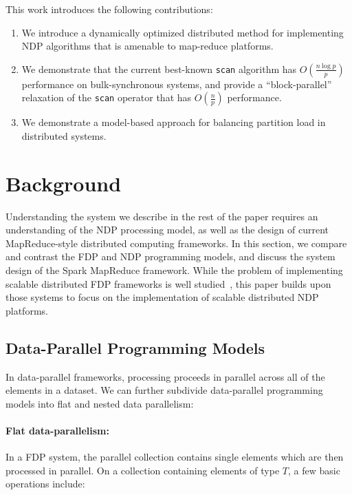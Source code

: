 \documentclass[preprint]{sigplanconf}
\theoremstyle{definition}
\begin{document}
This work introduces the following contributions:

\begin{enumerate}
\item We introduce a dynamically optimized distributed method for implementing NDP algorithms that is
amenable to map-reduce platforms.
\item We demonstrate that the current best-known \texttt{scan} algorithm has $O(\frac{n \log p}{p})$
performance on bulk-synchronous systems, and provide a ``block-parallel'' relaxation of the \texttt{scan}
operator that has $O(\frac{n}{p})$ performance.
\item We demonstrate a model-based approach for balancing partition load in distributed systems.
\end{enumerate}

\section{Background}
\label{sec:background}

Understanding the system we describe in the rest of the paper requires an understanding of the NDP
processing model, as well as the design of current MapReduce-style distributed computing frameworks.
In this section, we compare and contrast the FDP and NDP programming models, and discuss the
system design of the Spark MapReduce framework. While the problem of implementing scalable
distributed FDP frameworks is well studied~\cite{dean04, zaharia10}, this paper builds upon those
systems to focus on the implementation of scalable distributed NDP platforms.

\subsection{Data-Parallel Programming Models}
\label{sec:data-parallel-programming-models}

In data-parallel frameworks, processing proceeds in parallel across all of the elements in a dataset. We
can further subdivide data-parallel programming models into flat and nested data parallelism:

\paragraph{Flat data-parallelism:}

In a FDP system, the parallel collection contains single elements which are then processed in parallel.
On a collection containing elements of type $T$, a few basic operations include:
\end{document}
